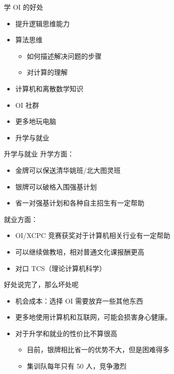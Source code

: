 \documentclass[11pt,aspectratio=169]{beamer}
\begin{document}
\begin{frame}{学 OI 的好处}
\begin{itemize}
    \item 提升逻辑思维能力
    \item 算法思维
    \begin{itemize}
        \item 如何描述解决问题的步骤
        \item 对计算的理解
    \end{itemize}
    \item 计算机和离散数学知识
    \item OI 社群
    \item 更多地玩电脑
    \item 升学与就业
\end{itemize}
\end{frame}

\begin{frame}{升学与就业}
升学方面：
    \begin{itemize}
        \item 金牌可以保送清华姚班/北大图灵班
        \item 银牌可以破格入围强基计划
        \item 省一对强基计划和各种自主招生有一定帮助 
    \end{itemize}
就业方面：
    \begin{itemize}
        \item OI/XCPC 竞赛获奖对于计算机相关行业有一定帮助
        \item 可以继续做教培，相对普通文化课报酬更高
        \item 对口 TCS（理论计算机科学）
    \end{itemize}
\end{frame}

\begin{frame}{好处说完了，那么坏处呢}
    \begin{itemize}
        \item 机会成本：选择 OI 需要放弃一些其他东西
        \item 更多地使用计算机和互联网，可能会损害身心健康。
        \item 对于升学和就业的性价比不算很高
        \begin{itemize}
            \item 目前，银牌相比省一的优势不大，但是困难得多
            \item 集训队每年只有 50 人，竞争激烈
        \end{itemize}
    \end{itemize}
\end{frame}
\end{document}

